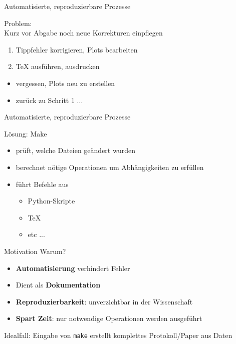 \begin{frame}{Automatisierte, reproduzierbare Prozesse}

  {\huge Problem:}\\
  \vspace{1em}
  Kurz vor Abgabe noch neue Korrekturen einpflegen
  \begin{enumerate}
    \item Tippfehler korrigieren, Plots bearbeiten
    \item \TeX{} ausführen, ausdrucken
  \end{enumerate}
  \begin{itemize}
    \item vergessen, Plots neu zu erstellen
    \item zurück zu Schritt 1 ...
  \end{itemize}
\end{frame}

\begin{frame}{Automatisierte, reproduzierbare Prozesse}

  {\huge Lösung: Make}
  \vspace{1em}
  \begin{itemize}
    \item prüft, welche Dateien geändert wurden
    \item berechnet nötige Operationen um Abhängigkeiten zu erfüllen
    \item führt Befehle aus
    \begin{itemize}
      \item Python-Skripte
      \item \TeX{}
      \item etc ...
    \end{itemize}
  \end{itemize}
\end{frame}

\begin{frame}{Motivation}
  {\huge Warum?}
  \vspace{1em}
  \begin{itemize}
    \item \textbf{Automatisierung} verhindert Fehler
    \item Dient als \textbf{Dokumentation}
    \item \textbf{Reproduzierbarkeit}: unverzichtbar in der Wissenschaft
    \item \textbf{Spart Zeit}: nur notwendige Operationen werden ausgeführt
  \end{itemize}
  \vspace{1em}
  Idealfall: Eingabe von \texttt{make} erstellt komplettes Protokoll/Paper aus Daten
\end{frame}

